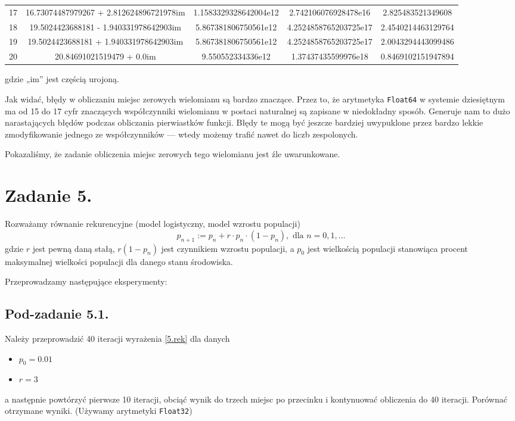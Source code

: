 \documentclass[10pt]{article}
\begin{document}
\begin{adjustbox}{center}
\begin{tabular}{|c| c c c c|}
        17 & 16.73074487979267 + 2.812624896721978im & 1.1583329328642004e12 & 2.742106076928478e16 & 2.825483521349608\\
        18 & 19.5024423688181 - 1.940331978642903im & 5.867381806750561e12 & 4.2524858765203725e17 & 2.4540214463129764\\
        19 & 19.5024423688181 + 1.940331978642903im & 5.867381806750561e12 & 4.2524858765203725e17 & 2.0043294443099486\\
        20 & 20.84691021519479 + 0.0im & 9.550552334336e12 & 1.37437435599976e18 & 0.8469102151947894\\
    \hline
    \end{tabular}
\end{adjustbox}

\noindent gdzie „im” jest częścią urojoną.

Jak widać, błędy w obliczaniu miejsc zerowych wielomianu są bardzo znaczące. Przez to, że arytmetyka \texttt{Float64} w systemie dziesiętnym ma od 15 do 17 cyfr znaczących współczynniki wielomianu w postaci naturalnej są zapisane w niedokładny sposób. Generuje nam to dużo narastających błędów podczas obliczania pierwiastków funkcji. Błędy te mogą być jeszcze bardziej uwypuklone przez bardzo lekkie zmodyfikowanie jednego ze współczynników — wtedy możemy trafić nawet do liczb zespolonych.

Pokazaliśmy, że zadanie obliczenia miejsc zerowych tego wielomianu jest źle uwarunkowane.

\section{Zadanie 5.}

Rozważamy równanie rekurencyjne (model logistyczny, model wzrostu populacji)
\begin{equation}
    p_{n+1} := p_n + r \cdot p_n \cdot (1 - p_n), \text{ dla } n = 0,1,\dots
    \label{5.rek}
\end{equation}
gdzie $r$ jest pewną daną stałą, $r(1 - p_n)$ jest czynnikiem wzrostu populacji, a $p_0$ jest wielkością populacji stanowiąca procent maksymalnej wielkości populacji dla danego stanu środowiska.

Przeprowadzamy następujące eksperymenty:

\subsection{Pod-zadanie 5.1.}
Należy przeprowadzić 40 iteracji wyrażenia \ref{5.rek} dla danych
\begin{itemize}
    \item $p_0 = 0.01$
    \item $r = 3$
\end{itemize}
a następnie powtórzyć pierwsze 10 iteracji, obciąć wynik do trzech miejsc po przecinku i kontynuować obliczenia do 40 iteracji. Porównać otrzymane wyniki. (Używamy arytmetyki \texttt{Float32})
\end{document}
